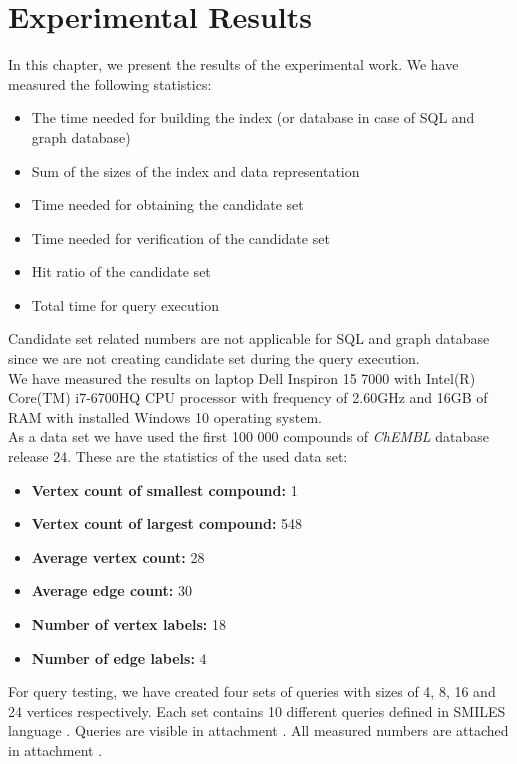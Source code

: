 \chapter{Experimental Results}

In this chapter, we present the results of the experimental work. We have measured the following statistics:

\begin{itemize}
	\item The time needed for building the index (or database in case of SQL and graph database)
	\item Sum of the sizes of the index and data representation
	\item Time needed for obtaining the candidate set
	\item Time needed for verification of the candidate set
	\item Hit ratio of the candidate set
	\item Total time for query execution
\end{itemize}

Candidate set related numbers are not applicable for SQL and graph database since we are not creating candidate set during the query execution.\\

We have measured the results on laptop Dell Inspiron 15 7000 with Intel(R) Core(TM) i7-6700HQ CPU processor with frequency of 2.60GHz and 16GB of RAM with installed Windows 10 operating system.\\

As a data set we have used the first 100 000 compounds of \textit{ChEMBL} database \cite{chembl} release 24. These are the statistics of the used data set:

\begin{itemize}
	\item \textbf{Vertex count of smallest compound:} 1
	\item \textbf{Vertex count of largest compound:} 548
	\item \textbf{Average vertex count:} 28
	\item \textbf{Average edge count:} 30 
	\item \textbf{Number of vertex labels:} 18 
	\item \textbf{Number of edge labels:} 4 
\end{itemize}

For query testing, we have created four sets of queries with sizes of 4, 8, 16 and 24 vertices respectively. Each set contains 10 different queries defined in SMILES language \cite{smiles}. Queries are visible in attachment . All measured numbers are attached in attachment .\\


